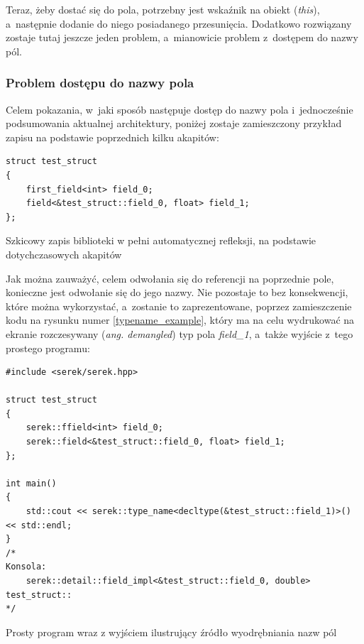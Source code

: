 \documentclass[12pt]{article}
\newcommand{\n}{\newline}
\newcommand{\nonpl}[1]{{\it #1}}
\newcommand{\code}[1]{{\it #1}}
\newcommand{\ang}[1]{\nonpl{ang. #1}}
\begin{document}
{{{				Teraz, żeby dostać się do pola, potrzebny jest wskaźnik na obiekt (\code{this}), a~następnie dodanie do niego posiadanego przesunięcia.
				Dodatkowo rozwiązany zostaje tutaj jeszcze jeden problem, a~mianowicie problem z~dostępem do nazwy pól.
			}

			{
				\subsubsection{Problem dostępu do nazwy pola}

				Celem pokazania, w~jaki sposób następuje dostęp do nazwy pola i~jednocześnie podsumowania aktualnej architektury, poniżej zostaje zamieszczony
				przykład zapisu na podstawie poprzednich kilku akapitów:\n

				\begin{captioned}[H]
					\begin{lstlisting}[frame=single]
struct test_struct
{
	first_field<int> field_0;
	field<&test_struct::field_0, float> field_1;
};
					\end{lstlisting}
					\caption{ Szkicowy zapis biblioteki w pełni automatycznej refleksji, na podstawie dotychczasowych akapitów}
					\label{serek_summary}
				\end{captioned}


				Jak można zauważyć, celem odwołania się do referencji na poprzednie pole, konieczne jest odwołanie się do jego nazwy. Nie pozostaje to bez
				konsekwencji, które można wykorzystać, a~zostanie to zaprezentowane, poprzez zamieszczenie kodu na rysunku numer \ref{typename_example}, który
				ma na celu wydrukować na ekranie rozczesywany (\ang{demangled}) typ pola \code{field\_1}, a~także wyjście z~tego prostego programu:\n

				\begin{captioned}[H]
				\begin{lstlisting}[frame=single]
#include <serek/serek.hpp>

struct test_struct
{
	serek::ffield<int> field_0;
	serek::field<&test_struct::field_0, float> field_1;
};

int main()
{
	std::cout << serek::type_name<decltype(&test_struct::field_1)>() << std::endl;
}
/*
Konsola:
	serek::detail::field_impl<&test_struct::field_0, double> test_struct::
*/
				\end{lstlisting}
				\caption{ Prosty program wraz z wyjściem ilustrujący źródło wyodrębniania nazw pól}
				\label{typename_example}
			\end{captioned}

}}}
\end{document}
